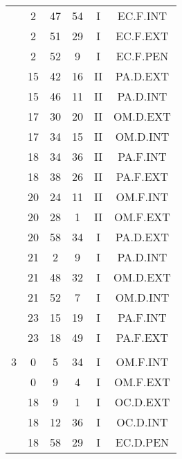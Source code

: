 \documentclass[12pt, a4paper]{article}
\begin{document}
\begin{multicols}{3}
{\begin{tabular}{c c c c c c}
	 	 	 	 & 2 & 47 & 54 & I & EC.F.INT\\%
	 	 	 	 & 2 & 51 & 29 & I & EC.F.EXT\\%
	 	 	 	 & 2 & 52 & 9 & I & EC.F.PEN\\%
	 	 	 	 & 15 & 42 & 16 & II & PA.D.EXT\\%
	 	 	 	 & 15 & 46 & 11 & II & PA.D.INT\\%
	 	 	 	 & 17 & 30 & 20 & II & OM.D.EXT\\%
	 	 	 	 & 17 & 34 & 15 & II & OM.D.INT\\%
	 	 	 	 & 18 & 34 & 36 & II & PA.F.INT\\%
	 	 	 	 & 18 & 38 & 26 & II & PA.F.EXT\\%
	 	 	 	 & 20 & 24 & 11 & II & OM.F.INT\\%
	 	 	 	 & 20 & 28 & 1 & II & OM.F.EXT\\%
	 	 	 	 & 20 & 58 & 34 & I & PA.D.EXT\\%
	 	 	 	 & 21 & 2 & 9 & I & PA.D.INT\\%
	 	 	 	 & 21 & 48 & 32 & I & OM.D.EXT\\%
	 	 	 	 & 21 & 52 & 7 & I & OM.D.INT\\%
	 	 	 	 & 23 & 15 & 19 & I & PA.F.INT\\%
	 	 	 	 & 23 & 18 & 49 & I & PA.F.EXT\\%
	 	 	 	 & & & & & \\%
	 	 	 	3 & 0 & 5 & 34 & I & OM.F.INT\\%
	 	 	 	 & 0 & 9 & 4 & I & OM.F.EXT\\%
	 	 	 	 & 18 & 9 & 1 & I & OC.D.EXT\\%
	 	 	 	 & 18 & 12 & 36 & I & OC.D.INT\\%
	 	 	 	 & 18 & 58 & 29 & I & EC.D.PEN\\%

\end{tabular}}
\end{multicols}
\end{document}
